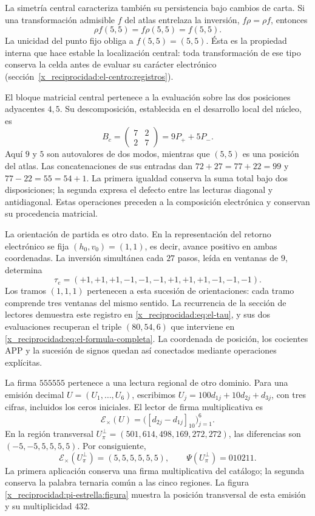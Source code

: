 

La simetría central caracteriza también su persistencia bajo cambios de
carta. Si una transformación admisible \(f\) del atlas entrelaza la
inversión, \(f\rho=\rho f\), entonces
\[
 \rho f(5,5)=f\rho(5,5)=f(5,5).
\]
La unicidad del punto fijo obliga a \(f(5,5)=(5,5)\). Ésta es la
propiedad interna que hace estable la localización central: toda
transformación de ese tipo conserva la celda antes de evaluar su
carácter electrónico (sección~\ref{x_reciprocidad:el-centro:registros}).

El bloque matricial central pertenece a la evaluación sobre las dos
posiciones adyacentes \(4,5\). Su descomposición, establecida en el
desarrollo local del núcleo, es
\[
 B_c=\begin{pmatrix}7&2\\2&7\end{pmatrix}=9P_++5P_-.
\]
Aquí \(9\) y \(5\) son autovalores de dos modos, mientras que
\((5,5)\) es una posición del atlas. Las concatenaciones de sus
entradas dan \(72+27=77+22=99\) y
\(77-22=55=54+1\). La primera igualdad conserva la suma total bajo
dos disposiciones; la segunda expresa el defecto entre las lecturas
diagonal y antidiagonal. Estas operaciones preceden a la composición
electrónica y conservan su procedencia matricial.

La orientación de partida es otro dato. En la representación del
retorno electrónico se fija \((h_0,v_0)=(1,1)\), es decir, avance
positivo en ambas coordenadas. La inversión simultánea cada \(27\)
pasos, leída en ventanas de \(9\), determina
\[
 \tau_e=(+1,+1,+1,-1,-1,-1,+1,+1,+1,-1,-1,-1).
\]
Los tramos \((1,1,1)\) pertenecen a esta sucesión de orientaciones:
cada tramo comprende tres ventanas del mismo sentido. La recurrencia
de la sección de lectores demuestra este registro en
\eqref{x_reciprocidad:eq:el-tau}, y sus dos evaluaciones recuperan el triple
\((80,54,6)\) que interviene en
\eqref{x_reciprocidad:eq:el-formula-completa}. La coordenada de posición, los
cocientes APP y la sucesión de signos quedan así conectados mediante
operaciones explícitas.

La firma \(555555\) pertenece a una lectura regional de otro
dominio. Para una emisión decimal \(U=(U_1,\ldots,U_6)\), escribimos
\(U_j=100d_{1j}+10d_{2j}+d_{3j}\), con tres cifras, incluidos los
ceros iniciales. El lector de firma multiplicativa es
\[
 \mathcal E_\times(U)
   =\bigl([d_{2j}-d_{1j}]_{10}\bigr)_{j=1}^{6}.
\]
En la región transversal
\(U_\pi^\perp=(501,614,498,169,272,272)\), las diferencias son
\((-5,-5,5,5,5,5)\). Por consiguiente,
\begin{equation}
 \mathcal E_\times(U_\pi^\perp)=(5,5,5,5,5,5),\qquad
 \Psi(U_\pi^\perp)=010211.
 \label{x_reciprocidad:el-centro:firma-transversal}
\end{equation}
La primera aplicación conserva una firma multiplicativa del catálogo;
la segunda conserva la palabra ternaria común a las cinco regiones.
La figura \ref{x_reciprocidad:pi-estrella:figura} muestra la posición transversal de
esta emisión y su multiplicidad \(432\).

